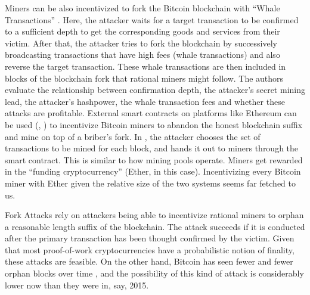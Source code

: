 Miners can be also incentivized to fork the Bitcoin blockchain with ``Whale Transactions'' \cite{whale_transactions}. Here, the attacker waits for a target transaction to be confirmed to a sufficient depth to get the corresponding goods and services from their victim. After that, the attacker tries to fork the blockchain by successively broadcasting transactions that have high fees (whale transactions) and also reverse the target transaction. These whale transactions are then included in blocks of the blockchain fork that rational miners might follow. The authors evaluate the relationship between confirmation depth, the attacker's secret mining lead, the attacker's hashpower, the whale transaction fees and whether these attacks are profitable. External smart contracts on platforms like Ethereum can be used (\cite{smart_contracts_for_bribing}, \cite{pay_to_win})  to incentivize Bitcoin miners to abandon the honest blockchain suffix and mine on top of a briber's fork. In \cite{pay_to_win}, the attacker chooses the set of transactions to be mined for each block, and hands it out to miners through the smart contract. This is similar to how mining pools operate. Miners get rewarded in the ``funding cryptocurrency'' (Ether, in this case). Incentivizing every Bitcoin miner with Ether given the relative size of the two systems seems far fetched to us.

Fork Attacks rely on attackers being able to incentivize rational miners to orphan a reasonable length suffix of the blockchain. The attack succeeds if it is conducted after the primary transaction has been thought confirmed by the victim. Given that most proof-of-work cryptocurrencies have a probabilistic notion of finality, these attacks are feasible. On the other hand, Bitcoin has seen fewer and fewer orphan blocks over time \cite{orphans}, and the possibility of this kind of attack is considerably lower now than they were in, say, 2015. 

